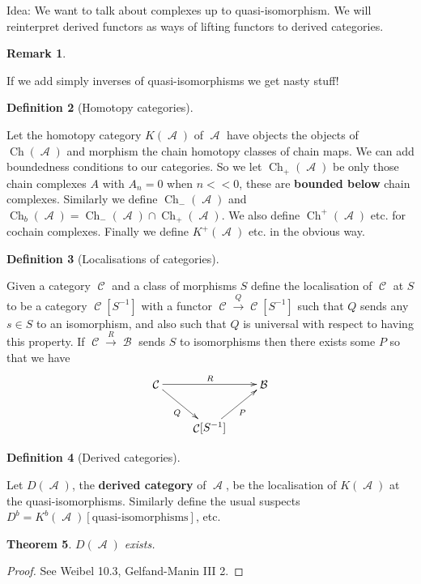 \documentclass[10pt,]{book}
\newcommand{\lt}{<}
\newcommand{\terminology}[1]{\textbf{#1}}
\theoremstyle{plain}
\newtheorem{theorem}{Theorem}[section]
\theoremstyle{definition}
\newtheorem{definition}[theorem]{Definition}
\newtheorem{remark}[theorem]{Remark}
\numberwithin{equation}{section}
\DeclareMathOperator{\Ch}{Ch}
\DeclareMathOperator{\cA}{\mathcal{A}}
\DeclareMathOperator{\cB}{\mathcal{B}}
\DeclareMathOperator{\cC}{\mathcal{C}}
\begin{document}
          Idea: We want to talk about complexes up to quasi-isomorphism.
          We will reinterpret derived functors as ways of lifting functors to derived categories.
\begin{remark}\label{remark-1}

            If we add simply inverses of quasi-isomorphisms we get nasty stuff!
          \end{remark}
\begin{definition}[Homotopy categories]\label{definition-21}

            Let the homotopy category \(K(\cA)\) of \(\cA\) have objects the objects of \(\Ch(\cA)\) and morphism the chain homotopy classes of chain maps.
            We can add boundedness conditions to our categories.
            So we let \(\Ch_{+}(\cA)\) be only those chain complexes \(A\) with \(A_n = 0\) when \(n \lt \lt 0\), these are \terminology{bounded below} chain complexes.
            Similarly we define \(\Ch_-(\cA)\) and \(\Ch_b(\cA) = \Ch_-(\cA) \cap \Ch_+(\cA)\).
            We also define \(\Ch^+(\cA)\) etc. for cochain complexes.
            Finally we define \(K^+(\cA)\) etc. in the obvious way.
          \end{definition}
\begin{definition}[Localisations of categories]\label{definition-22}

            Given a category \(\cC\) and a class of morphisms \(S\) define the localisation of \(\cC\) at \(S\) to be a category \(\cC[S^{-1}]\) with a functor \(\cC \xrightarrow{Q} \cC[S^{-1}]\) such that \(Q\) sends any \(s\in S\) to an isomorphism, and also such that \(Q\) is universal with respect to having this property.
            If \(\cC \xrightarrow{R} \cB\) sends \(S\) to isomorphisms then there exists some \(P\) so that we have
            \[
              \xymatrix{
              \cC \ar[rr]^R\ar[dr]_Q &&\cB\\
              &\cC[S^{-1}] \ar[ur]_{P}&
              }
            \]\end{definition}
\begin{definition}[Derived categories]\label{definition-23}

            Let \(D(\cA)\), the \terminology{derived category} of \(\cA\), be the localisation of \(K(\cA)\) at the quasi-isomorphisms.
            Similarly define the usual suspects \(D^b = K^b(\cA)[\text{quasi-isomorphisms}]\), etc.
          \end{definition}
\begin{theorem}\label{theorem-3}
\(D(\cA)\) exists.
          \end{theorem}
\begin{proof}
See Weibel 10.3, Gelfand-Manin III 2. \end{proof}
\par
\end{document}

